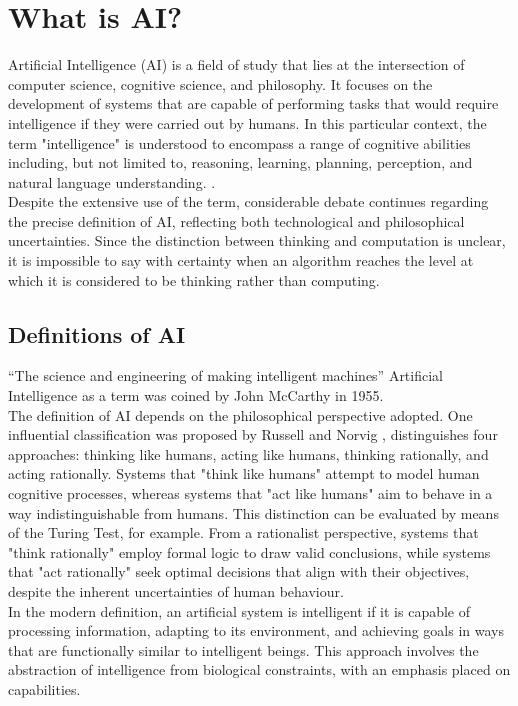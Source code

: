 \documentclass[runningheads]{llncs}
\begin{document}
\section{What is AI?}
%
Artificial Intelligence (AI) is a field of study that lies at the intersection of computer science, cognitive science, and philosophy. It focuses on the development of systems that are capable of performing tasks that would require intelligence if they were carried out by humans. In this particular context, the term "intelligence" is understood to encompass a range of cognitive abilities including, but not limited to, reasoning, learning, planning, perception, and natural language understanding. 
\cite{russell}.
\\
Despite the extensive use of the term, considerable debate continues regarding the precise definition of AI, reflecting both technological and philosophical uncertainties. Since the distinction between thinking and computation is unclear, it is impossible to say with certainty when an algorithm reaches the level at which it is considered to be thinking rather than computing.
%
%
\subsection{Definitions of AI}
%
``The science and engineering of making intelligent machines'' Artificial Intelligence as a term was coined by John McCarthy in 1955.
\\
The definition of AI depends on the philosophical perspective adopted. One influential classification was proposed by Russell and Norvig 
\cite{russell}, 
distinguishes four approaches: thinking like humans, acting like humans, thinking rationally, and acting rationally. Systems that "think like humans" attempt to model human cognitive processes, whereas systems that "act like humans" aim to behave in a way indistinguishable from humans. This distinction can be evaluated by means of the Turing Test, for example. From a rationalist perspective, systems that "think rationally" employ formal logic to draw valid conclusions, while systems that "act rationally" seek optimal decisions that align with their objectives, despite the inherent uncertainties of human behaviour.
\\
In the modern definition, an artificial system is intelligent if it is capable of processing information, adapting to its environment, and achieving goals in ways that are functionally similar to intelligent beings. This approach involves the abstraction of intelligence from biological constraints, with an emphasis placed on capabilities.
%
\end{document}
